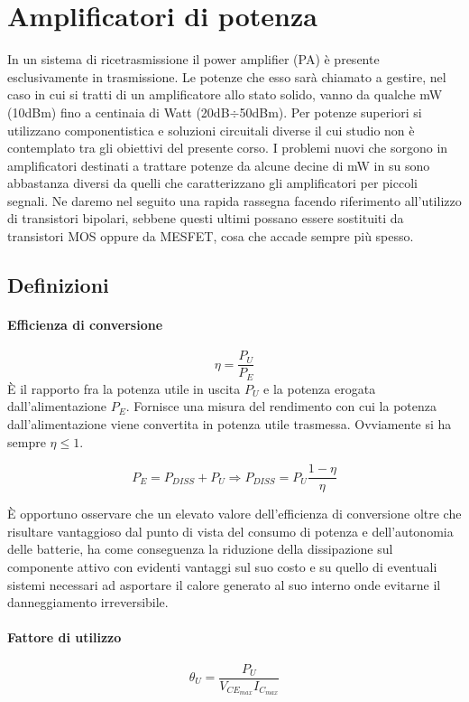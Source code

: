 \section{Amplificatori di potenza}
In un sistema di ricetrasmissione il power amplifier (PA) è presente esclusivamente in trasmissione.
Le potenze che esso sarà chiamato a gestire, nel caso in cui si tratti di un amplificatore allo stato
solido, vanno da qualche mW (10dBm) fino a centinaia di Watt (20dB$\div$50dBm). Per potenze
superiori si utilizzano componentistica e soluzioni circuitali diverse il cui studio non è contemplato
tra gli obiettivi del presente corso.
I problemi nuovi che sorgono in amplificatori destinati a trattare potenze da alcune decine di mW
in su sono abbastanza diversi da quelli che caratterizzano gli amplificatori per piccoli segnali. Ne daremo nel seguito una rapida rassegna facendo riferimento all'utilizzo di transistori bipolari, sebbene questi ultimi possano essere sostituiti da transistori MOS oppure da MESFET, cosa che accade sempre più spesso.

\subsection{Definizioni}
\paragraph{Efficienza di conversione}
\[  \eta = \frac{P_U}{P_E} \]
È il rapporto fra la potenza utile in uscita $P_U$ e la potenza erogata dall'alimentazione $P_E$. Fornisce una misura del rendimento con cui la potenza dall'alimentazione viene convertita in potenza utile trasmessa. Ovviamente si ha sempre $\eta \leq 1$.

\[P_{E} = P_{DISS} + P_{U} \Rightarrow P_{DISS} = P_{U} \frac{1-\eta}{\eta}  \]	

È opportuno osservare che un elevato valore dell'efficienza di conversione oltre che risultare
vantaggioso dal punto di vista del consumo di potenza e dell'autonomia delle batterie, ha come
conseguenza la riduzione della dissipazione sul componente attivo con evidenti vantaggi sul suo
costo e su quello di eventuali sistemi necessari ad asportare il calore generato al suo interno
onde evitarne il danneggiamento irreversibile.

\paragraph{Fattore di utilizzo}
\[\theta_U = \frac{P_U}{V_{CE_{max}} I_{C_{max}}}\]

